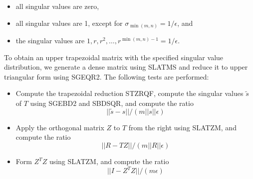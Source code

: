 \begin{itemize}
\item all singular values are zero,
\item all singular values are 1, except for $\sigma_{\min(m,n)} =
1/\epsilon$, and
\item the singular values are $1, r, r^2, \ldots, r^{\min(m,n)-1} =
1/\epsilon$.
\end{itemize}
To obtain an upper trapezoidal matrix with the specified singular value
distribution, we generate a dense matrix using SLATMS and reduce it to
upper triangular form using SGEQR2.
The following tests are performed:
\begin{itemize}
\item Compute the trapezoidal reduction STZRQF, compute the singular
values
$\tilde{s}$ of $T$ using SGEBD2 and SBDSQR, and compute the ratio
        $$||\tilde{s} - s||/(m||s||\epsilon)$$
\item Apply the orthogonal matrix $Z$ to $T$ from the right using
SLATZM,
        and compute the ratio
        $$|| R - TZ ||/(m ||R|| \epsilon)$$
\item Form $Z^T Z$ using SLATZM, and compute the ratio
        $$||I - Z^T Z||/(m \epsilon)$$
\end{itemize}

